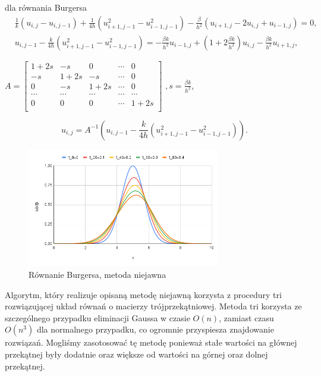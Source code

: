 \documentclass[12pt, a4paper]{article}
\begin{document}
dla równania Burgersa
\begin{equation}
\begin{split}
& \frac{1}{k}(u_{i,j}-u_{i,j-1})+\frac{1}{4h}(u_{i+1,j-1}^{2}-u_{i-1,j-1}^{2})-\frac{\beta}{h^{2}}(u_{i+1,j}-2u_{i,j}+u_{i-1,j})=0,\\
& u_{i,j-1}-\frac{k}{4h}(u_{i+1,j-1}^{2}-u_{i-1,j-1}^{2})=-\frac{\beta k}{h^{2}}u_{i-1,j}+(1+2\frac{\beta k}{h^{2}})u_{i,j}-\frac{\beta k}{h^{2}}u_{i+1,j},
\end{split}
\end{equation}
\begin{center}
$A=
\begin{bmatrix}
1+2s & -s & 0 & \cdots & 0\\
-s & 1+2s & -s & \cdots & 0\\
0 & -s & 1+2s & \cdots & 0\\
\cdots & \cdots & \cdots & \cdots & \cdots\\
0 & 0 & 0 & \cdots & 1+2s\\
\end{bmatrix}$
$,s=\frac{\beta k}{h^{2}}$,
\end{center}
\begin{equation}
u_{i,j}=A^{-1}(u_{i,j-1}-\frac{k}{4h}(u_{i+1,j-1}^{2}-u_{i-1,j-1}^{2})).
\end{equation}
\begin{figure}[h]
\caption{Równanie Burgersa, metoda niejawna}
\centering
\includegraphics[width=0.75\textwidth]{9}
\end{figure}
\newline
Algorytm, który realizuje opisaną metodę niejawną korzysta z procedury tri rozwiązującej układ równań o macierzy trójprzekątniowej. Metoda tri korzysta ze szczególnego przypadku eliminacji Gaussa w czasie $O(n)$, zamiast czasu $O(n^3)$ dla normalnego przypadku, co ogromnie przyspiesza znajdowanie rozwiązań. Mogliśmy zasotosować tę metodę ponieważ stałe wartości na głównej przekątnej były dodatnie oraz większe od wartości na górnej oraz dolnej przekątnej. 
\newpage
\end{document}
